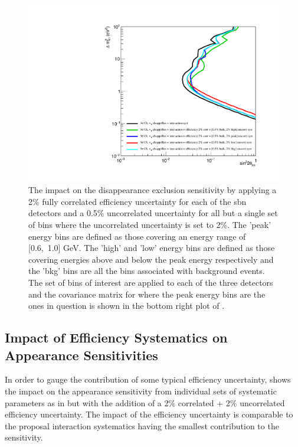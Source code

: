 \begin{figure}[!h]
    \centering
    \includegraphics[width = \largefigwidth]{figures-chap6/exclusion_contours/efficiency_systematics/numu_disapp_2pct_cor_05pct_bulk_2pct_X_uncor.pdf}
    \caption[\numu disapp with poorly constrained efficiency systematic for a set of bins.]{The impact on the \numu disappearance exclusion sensitivity by applying a 2\% fully correlated efficiency uncertainty for each of the \gls{sbn} detectors and a 0.5\% uncorrelated uncertainty for all but a single set of bins where the uncorrelated uncertainty is set to 2\%. The 'peak' energy bins are defined as those covering an energy range of [0.6,~1.0] GeV. The 'high' and 'low' energy bins are defined as those covering energies above and below the peak energy respectively and the 'bkg' bins are all the bins associated with background events. The set of bins of interest are applied to each of the three detectors and the covariance matrix for where the peak energy bins are the ones in question is shown in the bottom right plot of .}
    \label{fig:numu_bulk_uncorr}
\end{figure}


\clearpage
\subsection{\texorpdfstring{Impact of Efficiency Systematics on \nue Appearance Sensitivities}{Impact of Efficiency Systematics on nue Appearance Sensitivities}}

In order to gauge the contribution of some typical efficiency uncertainty,  shows the impact on the \nue appearance sensitivity from individual sets of systematic parameters as in  but with the addition of a 2\% correlated + 2\% uncorrelated efficiency uncertainty. The impact of the efficiency uncertainty is comparable to the proposal interaction systematics having the smallest contribution to the sensitivity. 

